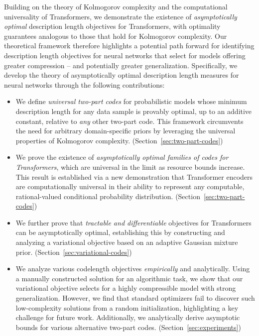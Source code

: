 Building on the theory of Kolmogorov complexity and the computational universality of Transformers, we demonstrate the existence of \emph{asymptotically optimal} description length objectives for Transformers, with optimality guarantees analogous to those that hold for Kolmogorov complexity. Our theoretical framework therefore highlights a potential path forward for identifying description length objectives for neural networks that select for models offering greater compression -- and potentially greater generalization. Specifically, we develop the theory of asymptotically optimal description length measures for neural networks through the following contributions:
\begin{itemize}
    \item We define \emph{universal two-part codes} for probabilistic models whose minimum description length for any data sample is provably optimal, up to an additive constant, relative to \emph{any} other two-part code. %
    This framework circumvents the need for arbitrary domain-specific priors by leveraging the universal properties of Kolmogorov complexity. (Section~\ref{sec:two-part-codes})
    \item We prove the existence of \emph{asymptotically optimal families of codes for Transformers}, which are universal in the limit as resource bounds increase. This result is established via a new demonstration that Transformer encoders are computationally universal in their ability to represent any computable, rational-valued conditional probability distribution. (Section~\ref{sec:two-part-codes})
\item We further prove that \emph{tractable and differentiable} objectives for Transformers can be asymptotically optimal, establishing this by constructing and analyzing a variational objective based on an adaptive Gaussian mixture prior. (Section~\ref{sec:variational-codes})
    \item We analyze various codelength objectives \emph{empirically} and analytically. Using a manually constructed solution for an algorithmic task, we show that our variational objective  selects for a highly compressible model with strong generalization. However, we find that standard optimizers fail to discover such low-complexity solutions from a random initialization, highlighting a key challenge for future work. Additionally, we analytically derive asymptotic bounds for various alternative two-part codes. (Section~\ref{sec:experiments})

\end{itemize}

